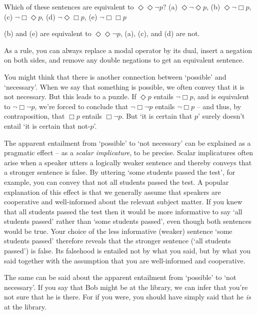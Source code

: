 \begin{exercise}
  Which of these sentences are equivalent to $\Diamond\Diamond \neg p$? (a)
  $\Diamond \neg \Diamond p$, (b) $\Diamond\neg \Box p$, (c)
  $\neg\Box\Diamond p$, (d) $\neg\Diamond\Box p$, (e) $\neg\Box\Box p$
\end{exercise}
\begin{solution}
  (b) and (e) are equivalent to $\Diamond\Diamond \neg p$, (a), (c), and (d) are
  not.
  
  As a rule, you can always replace a modal operator by its dual, insert a
  negation on both sides, and remove any double negations to get an equivalent
  sentence.
\end{solution}

You might think that there is another connection between `possible' and
`necessary'. When we say that something is possible, we often convey that it is
not necessary. But this leads to a puzzle. If $\Diamond p$ entails
$\neg \Box p$, and is equivalent to $\neg \Box \neg p$, we're forced to conclude
that $\neg\Box\neg p$ entails $\neg\Box p$ -- and thus, by contraposition, that
$\Box p$ entails $\Box \neg p$. But `it is certain that $p$' surely doesn't entail `it is certain that not-$p$'.

The apparent entailment from `possible' to `not necessary' can be explained as a
pragmatic effect -- as a \emph{scalar implicature}, to be precise. Scalar
implicatures often arise when a speaker utters a logically weaker sentence and
thereby conveys that a stronger sentence is false. By uttering `some students
passed the test', for example, you can convey that not all students passed the
test. A popular explanation of this effect is that we generally assume that
speakers are cooperative and well-informed about the relevant subject matter. If
you knew that all students passed the test then it would be more informative to
say `all students passed' rather than `some students passed', even though both
sentences would be true. Your choice of the less informative (weaker) sentence
`some students passed' therefore reveals that the stronger sentence (`all
students passed') is false. Its falsehood is entailed not by what you said, but
by what you said together with the assumption that you are well-informed and
cooperative.

The same can be said about the apparent entailment from `possible' to `not
necessary'. If you say that Bob might be at the library, we can infer that
you're not sure that he is there. For if you were, you should have simply said
that he \emph{is} at the library. 

